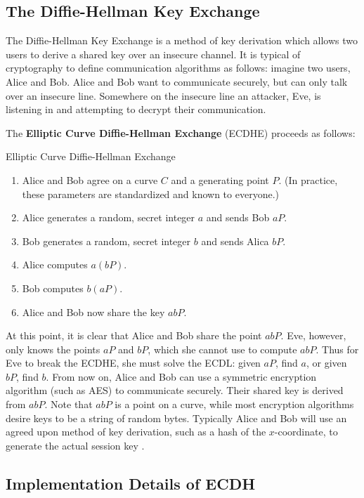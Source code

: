 \documentclass{article}
\begin{document}
\subsection{The Diffie-Hellman Key Exchange}
The Diffie-Hellman Key Exchange is a method of key derivation which allows two users to derive a shared key over an insecure channel.
It is typical of cryptography to define communication algorithms as follows: imagine two users, Alice and Bob.
Alice and Bob want to communicate securely, but can only talk over an insecure line.
Somewhere on the insecure line an attacker, Eve, is listening in and attempting to decrypt their communication.

The \textbf{Elliptic Curve Diffie-Hellman Exchange} (ECDHE) proceeds as follows:
\begin{algorithm}
\caption{Elliptic Curve Diffie-Hellman Exchange}
\begin{enumerate}
\item Alice and Bob agree on a curve $C$ and a generating point $P$. (In practice, these parameters are standardized and known to everyone.)
\item Alice generates a random, secret integer $a$ and sends Bob $aP$.
\item Bob generates a random, secret integer $b$ and sends Alica $bP$.
\item Alice computes $a(bP)$.
\item Bob computes $b(aP)$.
\item Alice and Bob now share the key $abP$.
\end{enumerate}
\end{algorithm}

At this point, it is clear that Alice and Bob share the point $abP$.
Eve, however, only knows the points $aP$ and $bP$, which she cannot use to compute $abP$.
Thus for Eve to break the ECDHE, she must solve the ECDL: given $aP$, find $a$, or given $bP$, find $b$.
From now on, Alice and Bob can use a symmetric encryption algorithm (such as AES) to communicate securely.
Their shared key is derived from $abP$.
Note that $abP$ is a point on a curve, while most encryption algorithms desire keys to be a string of random bytes.
Typically Alice and Bob will use an agreed upon method of key derivation, such as a hash of the $x$-coordinate, to generate the actual session key \cite[\S 6.2]{washington}.

\subsection{Implementation Details of ECDH}
\end{document}
